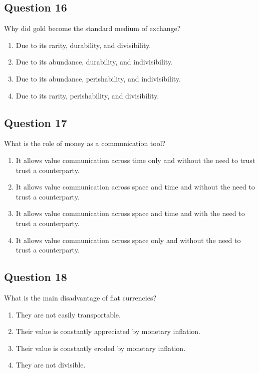 \documentclass[12pt,a4paper]{article}
\begin{document}
\subsection*{Question 16}
Why did gold become the standard medium of exchange?

\begin{enumerate}[label=\Alph*., leftmargin=*]
\item Due to its rarity, durability, and divisibility.
\item Due to its abundance, durability, and indivisibility.
\item Due to its abundance, perishability, and indivisibility.
\item Due to its rarity, perishability, and divisibility.
\end{enumerate}

\bigskip


\subsection*{Question 17}
What is the role of money as a communication tool?

\begin{enumerate}[label=\Alph*., leftmargin=*]
\item It allows value communication across time only and without the need to trust trust a counterparty.
\item It allows value communication across space and time and without the need to trust a counterparty.
\item It allows value communication across space and time and with the need to trust a counterparty.
\item It allows value communication across space only and without the need to trust a counterparty.
\end{enumerate}

\bigskip


\subsection*{Question 18}
What is the main disadvantage of fiat currencies?

\begin{enumerate}[label=\Alph*., leftmargin=*]
\item They are not easily transportable.
\item Their value is constantly appreciated by monetary inflation.
\item Their value is constantly eroded by monetary inflation.
\item They are not divisible.
\end{enumerate}
\end{document}
